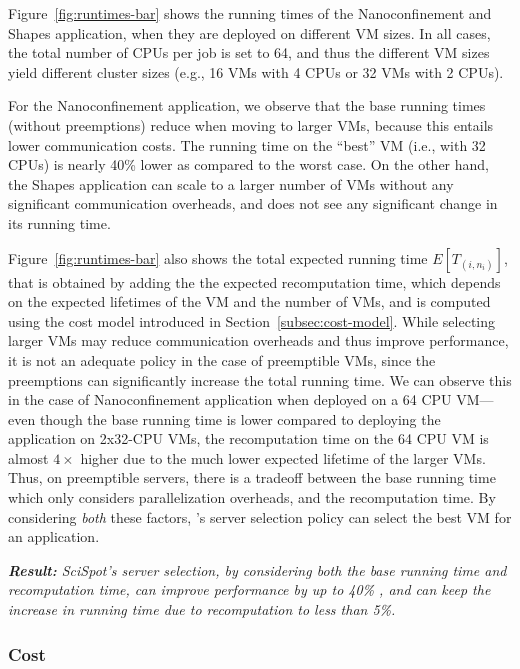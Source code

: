 Figure~\ref{fig:runtimes-bar} shows the running times of the Nanoconfinement and Shapes application, when they are deployed on different VM sizes.
In all cases, the total number of CPUs per job is set to 64, and thus the different VM sizes yield different cluster sizes (e.g., 16 VMs with 4 CPUs or 32 VMs with 2 CPUs).


For the Nanoconfinement application, we observe that the base running times (without preemptions) reduce when moving to larger VMs, because this entails lower communication costs.
The running time on the ``best'' VM (i.e., with 32 CPUs) is nearly 40\% lower as compared to the worst case. 
On the other hand, the Shapes application can scale to a larger number of VMs without any significant communication overheads, and does not see any significant change in its running time.

Figure~\ref{fig:runtimes-bar} also shows the total expected running time $E[T_{(i,n_i)}]$, that is obtained by adding the the expected recomputation time, which depends on the expected lifetimes of the VM and the number of VMs, and is computed using the cost model introduced in Section~\ref{subsec:cost-model}. 
While selecting larger VMs may reduce communication overheads and thus improve performance, it is not an adequate policy in the case of preemptible VMs, since the preemptions can significantly increase the total running time.
We can observe this in the case of Nanoconfinement application when deployed on a 64 CPU VM---even though the base running time is lower compared to deploying the application on 2x32-CPU VMs, the recomputation time on the 64 CPU VM is almost $4\times$ higher due to the much lower expected lifetime of the larger VMs. 
Thus, on preemptible servers, there is a tradeoff between the base running time which only considers parallelization overheads, and the recomputation time.
By considering \emph{both} these factors, \sysname's server selection policy can select the best VM for an application. 


\noindent \emph{\textbf{Result:} SciSpot's server selection, by considering both the base running time and recomputation time, can improve performance by up to 40\% , and can keep the increase in running time due to recomputation to less than 5\%.}

\subsubsection{Cost}

